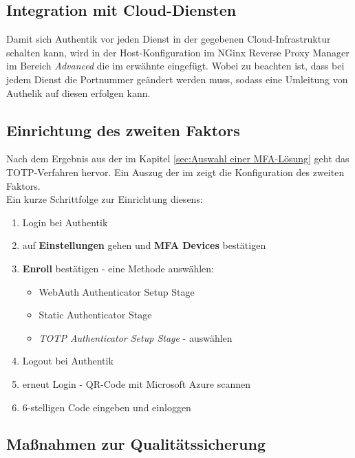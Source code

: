 \subsection{Integration mit Cloud-Diensten}
\label{sec:Integration mit Cloud-Diensten}
Damit sich Authentik vor jeden Dienst in der gegebenen Cloud-Infrastruktur schalten kann, wird in der Host-Konfiguration im NGinx Reverse 
Proxy Manager im Bereich \textit{Advanced} die im  erwähnte  eingefügt. Wobei zu beachten ist, 
dass bei jedem Dienst die Portnummer geändert werden muss, sodass eine Umleitung von Authelik auf diesen erfolgen kann.

\subsection{Einrichtung des zweiten Faktors}
\label{sec:Einrichtung des zweiten Faktors}
Nach dem Ergebnis aus der  im Kapitel \ref{sec:Auswahl einer MFA-Lösung}  
geht das \acs{TOTP}-Verfahren hervor. Ein Auszug der  im  zeigt die Konfiguration des 
zweiten Faktors.
\\Ein kurze Schrittfolge zur Einrichtung diesens:
\begin{enumerate}
    \item Login bei Authentik
    \item auf \textbf{Einstellungen} gehen und \textbf{\acs{MFA} Devices} bestätigen
    \item \textbf{Enroll} bestätigen - eine Methode auswählen:
    \begin{itemize}
        \item WebAuth Authenticator Setup Stage
        \item Static Authenticator Stage
        \item \textit{TOTP Authenticator Setup Stage} - auswählen
    \end{itemize}
   \item Logout bei Authentik
   \item erneut Login - QR-Code mit Microsoft Azure scannen
   \item 6-stelligen Code eingeben und einloggen
\end{enumerate}

\subsection{Maßnahmen zur Qualitätssicherung}
\label{sec:Qualitaetssicherung}

